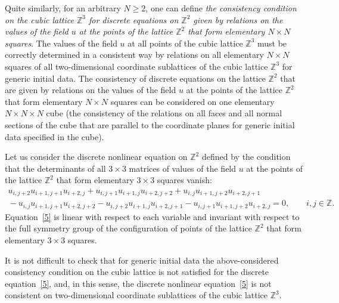 Quite similarly, for an arbitrary  $N \geq 2$, one can def\/ine {\it
the consistency condition on the cubic lattice $\mathbb{Z}^3$ for
discrete equations on $\mathbb{Z}^2$ given by relations on the
values of the field $u$ at the points of the lattice $\mathbb{Z}^2$
that form elementary $N \times N$ squares}. The values of the f\/ield
$u$ at all points of the cubic lattice $\mathbb{Z}^3$ must be
correctly determined in a consistent way by relations on all
elementary $N \times N$ squares of all two-dimensional coordinate
sublattices of the cubic lattice $\mathbb{Z}^3$ for generic initial
data. The consistency of discrete equations on the lattice
$\mathbb{Z}^2$ that are given by relations on the values of the
f\/ield $u$ at the points of the lattice $\mathbb{Z}^2$ that form
elementary $N \times N$ squares can be considered on one elementary
$N \times N \times N$ cube (the consistency of the relations on all
faces and all normal sections of the cube that are parallel to the
coordinate planes for generic initial data specif\/ied in the cube).


Let us consider the discrete nonlinear equation on
$\mathbb{Z}^2$ def\/ined by the condition that the determinants of all
$3 \times 3$ matrices of values of the f\/ield $u$ at the points of
the lattice $\mathbb{Z}^2$ that form elementary $3 \times 3$ squares
vanish:
\begin{gather}
u_{i, j + 2} u_{i + 1, j + 1} u_{i + 2, j} + u_{i, j
+ 1} u_{i + 1, j} u_{i + 2, j + 2} + u_{i, j} u_{i + 1, j +
2} u_{i + 2, j + 1}   \nonumber \\
{} - u_{i, j} u_{i + 1, j + 1} u_{i + 2, j + 2} - u_{i, j + 2} u_{i
+ 1, j} u_{i + 2, j + 1} - u_{i, j + 1} u_{i + 1, j + 2} u_{i + 2,
j} = 0, \qquad i, j \in \mathbb{Z}. \label{5}
\end{gather}
Equation~\eqref{5} is
linear with respect to each variable and invariant with respect to
the full symmetry group of the conf\/iguration of points of the
lattice $\mathbb{Z}^2$ that form elementary $3 \times 3$ squares.



It is not dif\/f\/icult to check that for generic initial data the
above-considered consistency condition on the cubic lattice is not
satisf\/ied for the discrete equation~\eqref{5}, and, in this sense,
the discrete nonlinear equation~\eqref{5} is not consistent on
two-dimensional coordinate sublattices of the cubic lattice
$\mathbb{Z}^3$.



